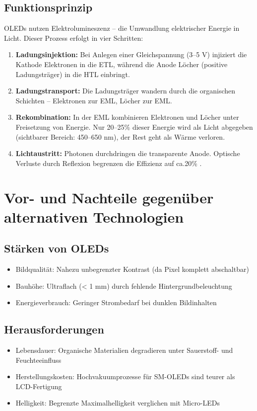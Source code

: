 \subsection{Funktionsprinzip}
OLEDs nutzen Elektrolumineszenz – die Umwandlung elektrischer Energie in Licht. Dieser Prozess erfolgt in vier Schritten:
\begin{enumerate}
	\item \textbf{Ladungsinjektion:}
	Bei Anlegen einer Gleichspannung (3–5 V) injiziert die Kathode Elektronen in die ETL, während die Anode Löcher (positive Ladungsträger) in die HTL einbringt.
	
	\item \textbf{Ladungstransport:}  
	Die Ladungsträger wandern durch die organischen Schichten – Elektronen zur EML, Löcher zur EML.  
	
	\item \textbf{Rekombination:}  
	In der EML kombinieren Elektronen und Löcher unter Freisetzung von Energie. Nur 20–25\% dieser Energie wird als Licht abgegeben (sichtbarer Bereich: 450–650 nm), der Rest geht als Wärme verloren.  
	
	\item \textbf{Lichtaustritt:}  
	Photonen durchdringen die transparente Anode. Optische Verluste durch Reflexion begrenzen die Effizienz auf ca.20\%  \cite{Wellmann:2017}.  
\end{enumerate}

\section{Vor- und Nachteile gegenüber alternativen Technologien}
\subsection{Stärken von OLEDs}
\begin{itemize}
	\item Bildqualität:
	Nahezu unbegrenzter Kontrast (da Pixel komplett abschaltbar)
	\item Bauhöhe:
	Ultraflach (< 1 mm) durch fehlende Hintergrundbeleuchtung
	\item Energieverbrauch:
	Geringer Strombedarf bei dunklen Bildinhalten
\end{itemize}
\cite{Bartlett:2023} \cite{Stotz:2019} \cite{Wellmann:2017}

\subsection{Herausforderungen}
\begin{itemize}
	\item Lebensdauer:
	Organische Materialien degradieren unter Sauerstoff- und Feuchteeinfluss 
	\item Herstellungskosten:
	Hochvakuumprozesse für SM-OLEDs sind teurer als LCD-Fertigung
	\item Helligkeit:
	Begrenzte Maximalhelligkeit verglichen mit Micro-LEDs
\end{itemize}

